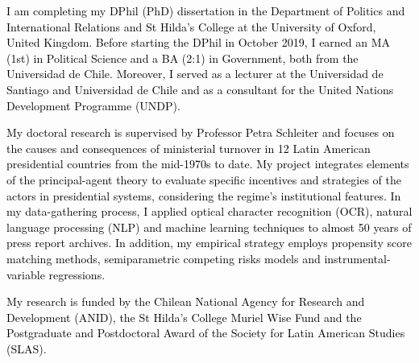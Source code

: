 




\vspace{3mm}

\begin{cvparagraph}

\textcolor{black}{I am completing my DPhil (PhD) dissertation in the Department of Politics and International Relations and St Hilda’s College at the University of Oxford, United Kingdom. Before starting the DPhil in October 2019, I earned an MA (1st) in Political Science and a BA (2:1) in Government, both from the Universidad de Chile. Moreover, I served as a lecturer at the Universidad de Santiago and Universidad de Chile and as a consultant for the United Nations Development Programme (UNDP).}

\textcolor{black}{My doctoral research is supervised by Professor Petra Schleiter and focuses on the causes and consequences of ministerial turnover in 12 Latin American presidential countries from the mid-1970s to date. My project integrates elements of the principal-agent theory to evaluate specific incentives and strategies of the actors in presidential systems, considering the regime’s institutional features. In my data-gathering process, I applied optical character recognition (OCR), natural language processing (NLP) and machine learning techniques to almost 50 years of press report archives. In addition, my empirical strategy employs propensity score matching methods, semiparametric competing risks models and instrumental-variable regressions.}

\textcolor{black}{My research is funded by the Chilean National Agency for Research and Development (ANID), the St Hilda’s College Muriel Wise Fund and the Postgraduate and Postdoctoral Award of the Society for Latin American Studies (SLAS).}
\vspace{1mm}
\end{cvparagraph}
